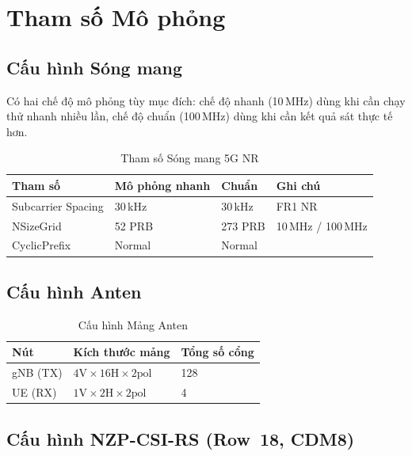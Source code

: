 \documentclass[11pt,a4paper]{article}
\begin{document}
\section{Tham số Mô phỏng}

\subsection{Cấu hình Sóng mang}

Có hai chế độ mô phỏng tùy mục đích: chế độ nhanh (10\,MHz) dùng khi cần chạy
thử nhanh nhiều lần, chế độ chuẩn (100\,MHz) dùng khi cần kết quả sát thực tế hơn.

\begin{table}[h!]
\centering
\caption{Tham số Sóng mang 5G NR}
\label{tab:carrier}
\begin{tabular}{llll}
\toprule
\textbf{Tham số} & \textbf{Mô phỏng nhanh} & \textbf{Chuẩn} & \textbf{Ghi chú} \\
\midrule
Subcarrier Spacing & 30\,kHz  & 30\,kHz   & FR1 NR \\
NSizeGrid          & 52 PRB   & 273 PRB   & 10\,MHz / 100\,MHz \\
CyclicPrefix       & Normal   & Normal    & \\
\bottomrule
\end{tabular}
\end{table}

\subsection{Cấu hình Anten}

\begin{table}[h!]
\centering
\caption{Cấu hình Mảng Anten}
\label{tab:antennas}
\begin{tabular}{lll}
\toprule
\textbf{Nút} & \textbf{Kích thước mảng} & \textbf{Tổng số cổng} \\
\midrule
gNB (TX) & $4\text{V}\times16\text{H}\times2\text{pol}$ & 128 \\
UE (RX)  & $1\text{V}\times2\text{H}\times2\text{pol}$  & 4 \\
\bottomrule
\end{tabular}
\end{table}

\subsection{Cấu hình NZP-CSI-RS (Row~18, CDM8)}
\end{document}
